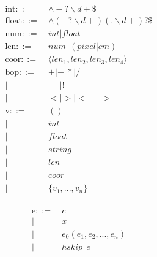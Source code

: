 \begin{figure*}[!ht]
\begin{minipage}{0.8\columnwidth}
\begin{align*}
\text{int} ::=~& \land-?\backslash d+\$\\
\text{float} ::=~& \land(-?\backslash d+)(.\backslash d+)?\$\\
\text{num} ::=~& int|float\\
\text{len} ::=~& num ~~ (pixel|cm)\\
\text{coor} ::=~& \langle len_1, len_2, len_3, len_4\rangle\\
\text{bop} ::= 
~& +|-|*|/\\
|~&=|!=\\
|~&<|>|<=|>=\\
\text{v} ::=~& 
() \\
|~& int \\
|~& float \\
|~& string \\
|~& len \\
|~& coor \\
|~& \{v_1, ..., v_n\} \\
\end{align*}
\end{minipage}
\begin{minipage}{0.8\columnwidth}
\begin{align*}
\text{e} ::= 
~& c \tag{constant}\label{syntax:constant}\\
|~& x \tag{name}\label{syntax:name}\\
|~& e_0(e_1, e_2, ..., e_n) \tag{constraints} \label{syntax:constraints}\\
|~& hskip ~~e \tag{horizontal skip}\label{syntax:hskip}\\

\end{align*}
\end{minipage}
\end{figure*}
